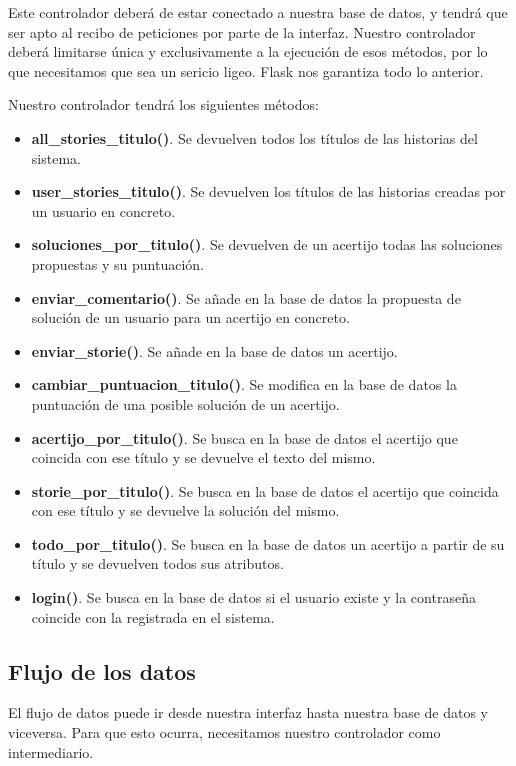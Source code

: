Este controlador deberá de estar conectado a nuestra base de datos, y tendrá que ser apto al recibo de peticiones por parte de la interfaz. Nuestro controlador deberá limitarse única y exclusivamente a la ejecución de esos métodos, por lo que necesitamos que sea un sericio ligeo. Flask nos garantiza todo lo anterior.

Nuestro controlador tendrá los siguientes métodos:

\begin{itemize}
    \item \textbf{all\_stories\_titulo()}. Se devuelven todos los títulos de las historias del sistema.
    \item \textbf{user\_stories\_titulo()}. Se devuelven los títulos de las historias creadas por un usuario en concreto.
    \item \textbf{soluciones\_por\_titulo()}. Se devuelven de un acertijo todas las soluciones propuestas y su puntuación.
    \item \textbf{enviar\_comentario()}. Se añade en la base de datos la propuesta de solución de un usuario para un acertijo en concreto.
    \item \textbf{enviar\_storie()}. Se añade en la base de datos un acertijo.
    \item \textbf{cambiar\_puntuacion\_titulo()}. Se modifica en la base de datos la puntuación de una posible solución de un acertijo.
    \item \textbf{acertijo\_por\_titulo()}. Se busca en la base de datos el acertijo que coincida con ese título y se devuelve el texto del mismo.
    \item \textbf{storie\_por\_titulo()}. Se busca en la base de datos el acertijo que coincida con ese título y se devuelve la solución del mismo.
    \item \textbf{todo\_por\_titulo()}. Se busca en la base de datos un acertijo a partir de su título y se devuelven todos sus atributos.
    \item \textbf{login()}. Se busca en la base de datos si el usuario existe y la contraseña coincide con la registrada en el sistema.
\end{itemize}

\subsection{Flujo de los datos}

El flujo de datos puede ir desde nuestra interfaz hasta nuestra base de datos y viceversa. Para que esto ocurra, necesitamos nuestro controlador como intermediario. 

